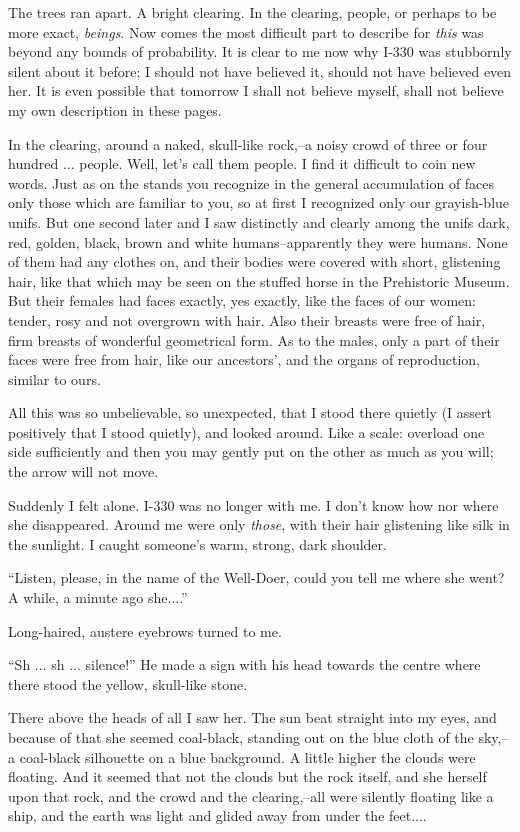 \documentclass[11pt,openany]{book}
\begin{document}
The trees ran apart. A bright clearing. In the clearing, people, or perhaps to be more exact, \emph{beings}. Now comes the most difficult part to describe for \emph{this} was beyond any bounds of probability. It is clear to me now why I-330 was stubbornly silent about it before; I should not have believed it, should not have believed even her. It is even possible that tomorrow I shall not believe myself, shall not believe my own description in these pages.

In the clearing, around a naked, skull-like rock,--a noisy crowd of three or four hundred ... people. Well, let's call them people. I find it difficult to coin new words. Just as on the stands you recognize in the general accumulation of faces only those which are familiar to you, so at first I recognized only our grayish-blue unifs. But one second later and I saw distinctly and clearly among the unifs dark, red, golden, black, brown and white humans--apparently they were humans. None of them had any clothes on, and their bodies were covered with short, glistening hair, like that which may be seen on the stuffed horse in the Prehistoric Museum. But their females had faces exactly, yes exactly, like the faces of our women: tender, rosy and not overgrown with hair. Also their breasts were free of hair, firm breasts of wonderful geometrical form. As to the males, only a part of their faces were free from hair, like our ancestors', and the organs of reproduction, similar to ours.

All this was so unbelievable, so unexpected, that I stood there quietly (I assert positively that I stood quietly), and looked around. Like a scale: overload one side sufficiently and then you may gently put on the other as much as you will; the arrow will not move.

Suddenly I felt alone. I-330 was no longer with me. I don't know how nor where she disappeared. Around me were only \emph{those}, with their hair glistening like silk in the sunlight. I caught someone's warm, strong, dark shoulder.

``Listen, please, in the name of the Well-Doer, could you tell me where she went? A while, a minute ago she....''

Long-haired, austere eyebrows turned to me.

``Sh ... sh ... silence!'' He made a sign with his head towards the centre where there stood the yellow, skull-like stone.

There above the heads of all I saw her. The sun beat straight into my eyes, and because of that she seemed coal-black, standing out on the blue cloth of the sky,--a coal-black silhouette on a blue background. A little higher the clouds were floating. And it seemed that not the clouds but the rock itself, and she herself upon that rock, and the crowd and the clearing,--all were silently floating like a ship, and the earth was light and glided away from under the feet....
\end{document}

